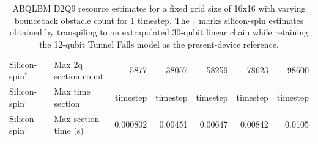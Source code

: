 \begin{table}
\begin{tabular}{llrrrrr}
Silicon-spin$^{\dagger}$ & Max 2q section count & 5877 & 38057 & 58259 & 78623 & 98600 \\
Silicon-spin$^{\dagger}$ & Max time section & timestep & timestep & timestep & timestep & timestep \\
Silicon-spin$^{\dagger}$ & Max section time (s) & 0.000802 & 0.00451 & 0.00647 & 0.00842 & 0.0105 \\
\hline
\end{tabular}
\caption{ABQLBM D2Q9 resource estimates for a fixed grid size of 16x16 with varying bounceback obstacle count for 1 timestep. The \(\dagger\) marks silicon-spin estimates obtained by transpiling to an extrapolated 30-qubit linear chain while retaining the 12-qubit Tunnel Falls model as the present-device reference.}
\label{tab:abqlbm-obstacle-resources}
\end{table}
